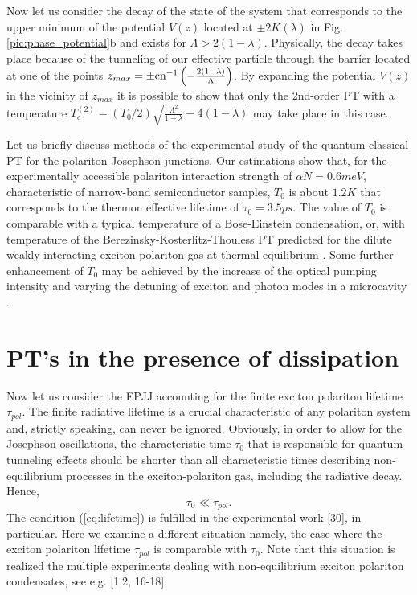 \documentclass[aps, pre, preprint, groupedaddress, superscriptaddress, showkeys, showpacs] {revtex4-1}
\begin{document}
Now let us consider the decay of the state of the system that corresponds to the upper minimum of the potential $V(z)$ located at $\pm 2K(\lambda)$ in Fig. \ref{pic:phase_potential}b and exists for $\Lambda > 2(1 - \lambda)$.
Physically, the decay takes place because of the tunneling of our effective particle through the barrier located at one of the points $z_{max} = \pm \textrm{cn}^{-1} \left( -\frac{2(1 - \lambda)}{\Lambda} \right)$.
By expanding the potential $V(z)$ in the vicinity of $z_{max}$ it is possible to show that only the 2nd-order PT with a temperature $T_{c}^{(2)} = (T_{0}/ 2) \sqrt{\frac{\Lambda^2}{1 - \lambda} - 4(1 - \lambda)}$ may take place in this case.

Let us briefly discuss methods of the experimental study of the quantum-classical PT for the polariton Josephson junctions.
Our estimations show that, for the experimentally accessible polariton interaction strength of $\alpha N=0.6meV$, characteristic of narrow-band semiconductor samples, $T_{0}$ is about $1.2K$ that corresponds to the thermon effective lifetime of $\tau_{0}=3.5ps$.
The value of $T_{0}$ is comparable with a typical temperature of a Bose-Einstein condensation, or, with temperature of the Berezinsky-Kosterlitz-Thouless PT predicted for the dilute weakly interacting exciton polariton gas at thermal equilibrium \cite{Sanvitto,Guillet}.
Some further enhancement of $T_{0}$ may be achieved by the increase of the optical pumping intensity and varying the detuning of exciton and photon modes in a microcavity \cite{Snoke_2017}.  

\section{PT's in the presence of dissipation 
\label{sec:non-equilibrium}}

Now let us consider the EPJJ accounting for the finite exciton polariton lifetime $\tau_{pol}$. 
The finite radiative lifetime is a crucial characteristic of any polariton system and, strictly speaking, can never be ignored.
Obviously, in order to allow for the Josephson oscillations, the characteristic time $\tau_0$ that is responsible for quantum tunneling effects  should be shorter than all characteristic times describing non-equilibrium processes in the exciton-polariton gas, including the radiative decay. Hence,
%
\begin{equation}
\tau_{0}\ll\tau_{pol}.
\label{eq:lifetime}  
\end{equation}
%
The condition (\ref{eq:lifetime}) is fulfilled in the experimental work [30], in particular.
Here we examine a different situation namely, the case where the exciton polariton lifetime $\tau_{pol}$ is comparable with $\tau_{0}$.
Note that this situation is realized the multiple experiments dealing with non-equilibrium exciton polariton condensates, see e.g. [1,2, 16-18].  
\end{document}
